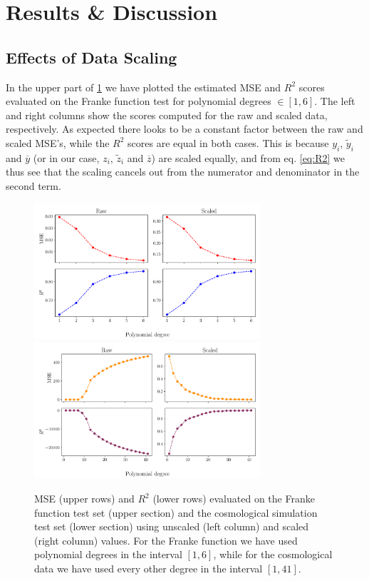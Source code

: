 \documentclass[aps,pra,english,notitlepage,reprint,nofootinbib]{revtex4-1}  %
\begin{document}
\section{Results \& Discussion}\label{sec:results discussion}
\subsection{Effects of Data Scaling}\label{subsec:scaling effect}
In the upper part of \cref{fig:error scaled vs raw} we have plotted the estimated MSE and $R^2$ scores evaluated on the Franke function test for polynomial degrees $\in[1,6]$. The left and right columns show the scores computed for the raw and scaled data, respectively. As expected there looks to be a constant factor between the raw and scaled MSE's, while the $R^2$ scores are equal in both cases. This is because $y_i$, $\tilde{y}_i$ and $\overline{y}$ (or in our case, $z_i$, $\tilde{z}_i$ and $\overline{z}$) are scaled equally, and from eq. \eqref{eq:R2} we thus see that the scaling cancels out from the numerator and denominator in the second term. 

\begin{figure}
  \vspace*{-5pt}
  \centering %
  \includegraphics[trim = 0 1.5cm 0 0,clip,width=0.75\textwidth,keepaspectratio]{../figs/a_error_scaled_vs_raw.pdf}
  \centering
  \includegraphics[width=0.75\textwidth]{../figs/g_error_scaled_vs_raw.pdf}
  \caption{MSE (upper rows) and $R^2$ (lower rows) evaluated on the Franke function test set (upper section) and the cosmological simulation test set (lower section) using unscaled (left column) and scaled (right column) values. For the Franke function we have used polynomial degrees in the interval $[1,6]$, while for the cosmological data we have used every other degree in the interval $[1,41]$.}\label{fig:error scaled vs raw}
  \vspace*{-5pt}
\end{figure}
\end{document}
